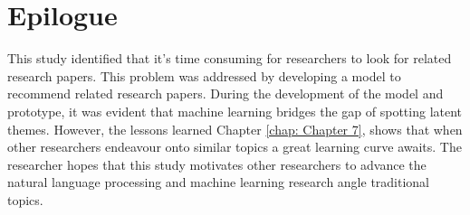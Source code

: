 \section{Epilogue}
This study identified that it's time consuming for researchers to look for related research papers. This problem was addressed by developing a model to recommend related research papers. During the development of the model and prototype, it was evident that machine learning bridges the gap of spotting latent themes. However, the lessons learned Chapter \ref{chap: Chapter 7}, shows that when other researchers endeavour onto similar topics a great learning curve awaits. The researcher hopes that this study motivates other researchers to advance the natural language processing and machine learning research angle traditional topics.
